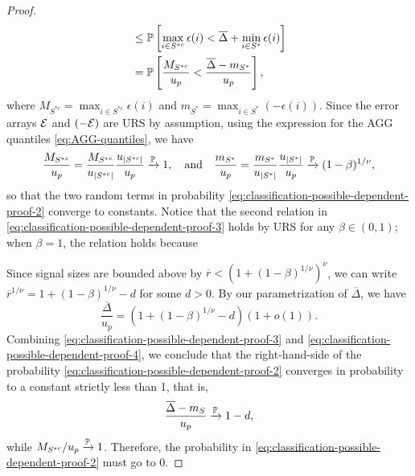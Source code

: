 \begin{proof}
\begin{align}
    &\le \P\left[{\max_{i\in S^{*c}}\epsilon(i)} < {\overline{\Delta} + \min_{i\in S^*}\epsilon(i)}\right] \nonumber \\
  &= \P\left[ \frac{M_{S^{*c}}}{u_p} < \frac{\overline{\Delta} - m_{S^*}}{u_p} \right], \label{eq:classification-possible-dependent-proof-2}
\end{align}
where $M_{S^{*c}} = \max_{i\in S^{*c}}\epsilon(i)$ and $m_{S^*} = \max_{i\in S^*}\left(-\epsilon(i)\right)$.
Since the error arrays ${\cal E}$ and $(-{\cal E})$ are URS by assumption, using the expression for the AGG quantiles \eqref{eq:AGG-quantiles}, we have
\begin{equation} \label{eq:classification-possible-dependent-proof-3}
    \frac{M_{S^{*c}}}{u_p} = \frac{M_{S^{*c}}}{u_{|S^{*c}|}} \frac{u_{|S^{*c}|}}{u_p} \xrightarrow{\P} 1,
\quad \text{and} \quad
\frac{m_{S^*}}{u_p} = \frac{m_{S^*}}{u_{|S^*|}} \frac{u_{|S^*|}}{u_p} \xrightarrow{\P} (1-\beta)^{1/\nu},
\end{equation}
so that the two random terms in probability \eqref{eq:classification-possible-dependent-proof-2} converge to constants.
Notice that the second relation in \eqref{eq:classification-possible-dependent-proof-3} holds by URS for any $\beta\in(0,1)$; when $\beta=1$, the relation holds because 

Since signal sizes are bounded above by $\overline{r} < \left(1 + (1-\beta)^{1/\nu}\right)^{\nu}$, we can write $\overline{r}^{1/\nu} = 1 + (1-\beta)^{1/\nu} - d$ for some $d > 0$. By our parametrization of $\overline{\Delta}$, we have
\begin{equation} \label{eq:classification-possible-dependent-proof-4}
    \frac{\overline{\Delta}}{u_p} = \left(1+(1-\beta)^{1/\nu}-d\right)(1+o(1)).
\end{equation}
Combining \eqref{eq:classification-possible-dependent-proof-3} and \eqref{eq:classification-possible-dependent-proof-4}, we conclude that the right-hand-side of the probability \eqref{eq:classification-possible-dependent-proof-2} converges in probability to a constant strictly less than 1, that is, 
\begin{equation}
    \frac{\overline{\Delta} - m_S}{u_p} \xrightarrow{\P} 1 - d,
\end{equation}
while ${M_{S^{*c}}}/{u_p} \xrightarrow{\P} 1$.
Therefore, the probability in \eqref{eq:classification-possible-dependent-proof-2} must go to 0.
\end{proof}


